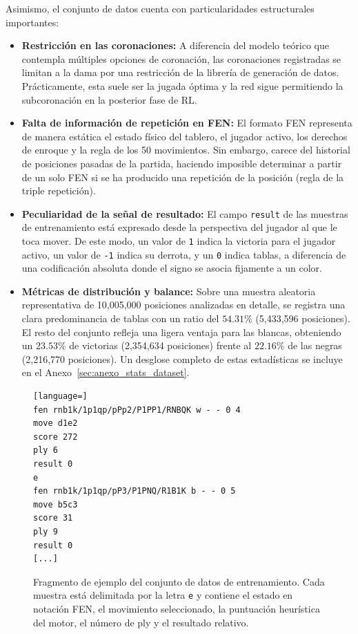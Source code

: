 \documentclass[12pt, a4paper]{article}
\begin{document}
Asimismo, el conjunto de datos cuenta con particularidades estructurales importantes:
\begin{itemize}
    \item \textbf{Restricción en las coronaciones:} A diferencia del modelo teórico que contempla múltiples opciones de coronación, las coronaciones registradas se limitan a la dama por una restricción de la librería de generación de datos. Prácticamente, esta suele ser la jugada óptima y la red sigue permitiendo la subcoronación en la posterior fase de RL.
    \item \textbf{Falta de información de repetición en FEN:} El formato FEN representa de manera estática el estado físico del tablero, el jugador activo, los derechos de enroque y la regla de los 50 movimientos. Sin embargo, carece del historial de posiciones pasadas de la partida, haciendo imposible determinar a partir de un solo FEN si se ha producido una repetición de la posición (regla de la triple repetición).
    \item \textbf{Peculiaridad de la señal de resultado:} El campo \texttt{result} de las muestras de entrenamiento está expresado desde la perspectiva del jugador al que le toca mover. De este modo, un valor de \texttt{1} indica la victoria para el jugador activo, un valor de \texttt{-1} indica su derrota, y un \texttt{0} indica tablas, a diferencia de una codificación absoluta donde el signo se asocia fijamente a un color.
    \item \textbf{Métricas de distribución y balance:} Sobre una muestra aleatoria representativa de 10,005,000 posiciones analizadas en detalle, se registra una clara predominancia de tablas con un ratio del $54.31\%$ (5,433,596 posiciones). El resto del conjunto refleja una ligera ventaja para las blancas, obteniendo un $23.53\%$ de victorias (2,354,634 posiciones) frente al $22.16\%$ de las negras (2,216,770 posiciones). Un desglose completo de estas estadísticas se incluye en el Anexo~\ref{sec:anexo_stats_dataset}.
\end{itemize}

\begin{figure}[htbp]
    \centering
    \begin{minipage}{0.8\textwidth}
\begin{lstlisting}[language=]
fen rnb1k/1p1qp/pPp2/P1PP1/RNBQK w - - 0 4
move d1e2
score 272
ply 6
result 0
e
fen rnb1k/1p1qp/pP3/P1PNQ/R1B1K b - - 0 5
move b5c3
score 31
ply 9
result 0
[...]
\end{lstlisting}
    \end{minipage}
    \caption[Ejemplo del conjunto de datos]{Fragmento de ejemplo del conjunto de datos de entrenamiento. Cada muestra está delimitada por la letra \texttt{e} y contiene el estado en notación FEN, el movimiento seleccionado, la puntuación heurística del motor, el número de ply y el resultado relativo.}
    \label{fig:dataset_example}
\end{figure}
\end{document}
